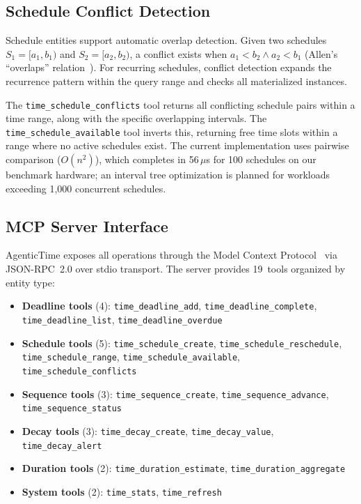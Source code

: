 \documentclass[10pt, twocolumn]{article}
\begin{document}
\subsection{Schedule Conflict Detection}
\label{sec:conflicts}

Schedule entities support automatic overlap detection. Given two schedules $S_1 = [a_1, b_1)$ and $S_2 = [a_2, b_2)$, a conflict exists when $a_1 < b_2 \land a_2 < b_1$ (Allen's ``overlaps'' relation~\cite{allen1983temporal}). For recurring schedules, conflict detection expands the recurrence pattern within the query range and checks all materialized instances.

The \texttt{time\_schedule\_conflicts} tool returns all conflicting schedule pairs within a time range, along with the specific overlapping intervals. The \texttt{time\_schedule\_available} tool inverts this, returning free time slots within a range where no active schedules exist. The current implementation uses pairwise comparison ($O(n^2)$), which completes in 56\,$\mu$s for 100 schedules on our benchmark hardware; an interval tree optimization is planned for workloads exceeding 1{,}000 concurrent schedules.


\subsection{MCP Server Interface}
\label{sec:mcp}

AgenticTime exposes all operations through the Model Context Protocol~\cite{mcp2024} via JSON-RPC~2.0 over stdio transport. The server provides 19~tools organized by entity type:

\begin{itemize}[nosep, leftmargin=*]
  \item \textbf{Deadline tools} (4): \texttt{time\_deadline\_add}, \texttt{time\_deadline\_complete}, \texttt{time\_deadline\_list}, \texttt{time\_deadline\_overdue}
  \item \textbf{Schedule tools} (5): \texttt{time\_schedule\_create}, \texttt{time\_schedule\_reschedule}, \texttt{time\_schedule\_range}, \texttt{time\_schedule\_available}, \texttt{time\_schedule\_conflicts}
  \item \textbf{Sequence tools} (3): \texttt{time\_sequence\_create}, \texttt{time\_sequence\_advance}, \texttt{time\_sequence\_status}
  \item \textbf{Decay tools} (3): \texttt{time\_decay\_create}, \texttt{time\_decay\_value}, \texttt{time\_decay\_alert}
  \item \textbf{Duration tools} (2): \texttt{time\_duration\_estimate}, \texttt{time\_duration\_aggregate}
  \item \textbf{System tools} (2): \texttt{time\_stats}, \texttt{time\_refresh}
\end{itemize}
\end{document}
